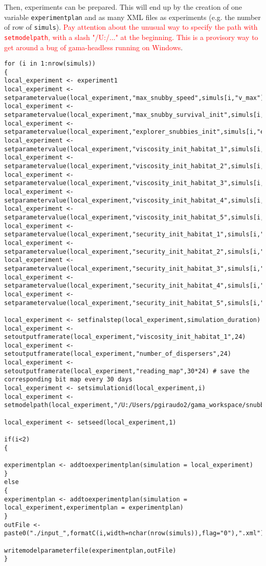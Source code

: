 Then, experiments can be prepared. This will end up by the creation of one variable \texttt{experimentplan} and as many XML files as experiments (e.g. the number of row of \texttt{simuls}). \textcolor{red}{Pay attention about the unusual way to specify the path with \texttt{setmodelpath}, with a slash "/U:/..." at the beginning. This is a provisory way to get around a bug of gama-headless running on Windows}.

\begin{lstlisting}
for (i in 1:nrow(simuls))
{
local_experiment <- experiment1
local_experiment <-  setparametervalue(local_experiment,"max_snubby_speed",simuls[i,"v_max"])
local_experiment <-  setparametervalue(local_experiment,"max_snubby_survival_init",simuls[i,"s_max"])
local_experiment <-  setparametervalue(local_experiment,"explorer_snubbies_init",simuls[i,"explorer_snubbies"])
local_experiment <-  setparametervalue(local_experiment,"viscosity_init_habitat_1",simuls[i,"viscosity_factor_habitat_1"])
local_experiment <-  setparametervalue(local_experiment,"viscosity_init_habitat_2",simuls[i,"viscosity_factor_habitat_2"])
local_experiment <-  setparametervalue(local_experiment,"viscosity_init_habitat_3",simuls[i,"viscosity_factor_habitat_3"])
local_experiment <-  setparametervalue(local_experiment,"viscosity_init_habitat_4",simuls[i,"viscosity_factor_habitat_4"])
local_experiment <-  setparametervalue(local_experiment,"viscosity_init_habitat_5",simuls[i,"viscosity_factor_habitat_5"])
local_experiment <-  setparametervalue(local_experiment,"security_init_habitat_1",simuls[i,"security_factor_habitat_1"])
local_experiment <-  setparametervalue(local_experiment,"security_init_habitat_2",simuls[i,"security_factor_habitat_2"])
local_experiment <-  setparametervalue(local_experiment,"security_init_habitat_3",simuls[i,"security_factor_habitat_3"])
local_experiment <-  setparametervalue(local_experiment,"security_init_habitat_4",simuls[i,"security_factor_habitat_4"])
local_experiment <-  setparametervalue(local_experiment,"security_init_habitat_5",simuls[i,"security_factor_habitat_5"])

local_experiment <- setfinalstep(local_experiment,simulation_duration)
local_experiment <- setoutputframerate(local_experiment,"viscosity_init_habitat_1",24)
local_experiment <- setoutputframerate(local_experiment,"number_of_dispersers",24)
local_experiment <- setoutputframerate(local_experiment,"reading_map",30*24) # save the corresponding bit map every 30 days
local_experiment <- setsimulationid(local_experiment,i)
local_experiment <- setmodelpath(local_experiment,"/U:/Users/pgiraudo2/gama_workspace/snubbies/models/snubbies.gaml")

local_experiment <- setseed(local_experiment,1)

if(i<2)
{

experimentplan <- addtoexperimentplan(simulation = local_experiment)
}
else
{
experimentplan <- addtoexperimentplan(simulation = local_experiment,experimentplan = experimentplan)
}
outFile <- paste0("./input_",formatC(i,width=nchar(nrow(simuls)),flag="0"),".xml")

writemodelparameterfile(experimentplan,outFile)
}

\end{lstlisting}

